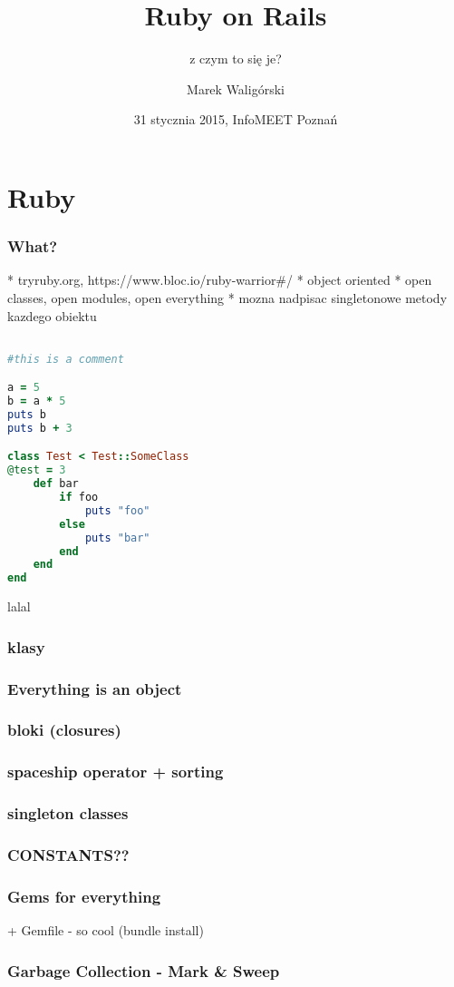 \documentclass{beamer}
\begin{document}
\title{Ruby on Rails}
\subtitle{z czym to się je?}
\author{Marek Waligórski}
\date{31 stycznia 2015, InfoMEET Poznań}

\begin{frame}[fragile]
\titlepage
\end{frame}

\section{Ruby}
\begin{frame}[fragile]\frametitle{What?}
  * tryruby.org, https://www.bloc.io/ruby-warrior#/
  * object oriented
  * open classes, open modules, open everything
  * mozna nadpisac singletonowe metody kazdego obiektu
\end{frame}

\begin{frame}[fragile]
\begin{lstlisting}[language=Ruby]

#this is a comment

a = 5
b = a * 5
puts b
puts b + 3

class Test < Test::SomeClass
@test = 3
    def bar
        if foo
            puts "foo"
        else
            puts "bar"
        end
    end
end
\end{lstlisting}
lalal
\end{frame}

\begin{frame}[fragile]
\frametitle{klasy}
\end{frame}
\begin{frame}[fragile]
\frametitle{Everything is an object}
\end{frame}
\begin{frame}[fragile]
\frametitle{bloki (closures)}
\end{frame}
\begin{frame}[fragile]
\frametitle{spaceship operator + sorting}
\end{frame}
\begin{frame}[fragile]
\frametitle{singleton classes}
\end{frame}
\begin{frame}[fragile]
\frametitle{CONSTANTS??}
\end{frame}
\begin{frame}[fragile]
\frametitle{Gems for everything}
 + Gemfile - so cool (bundle install)
\end{frame}
\begin{frame}[fragile]
\frametitle{Garbage Collection - Mark \& Sweep}
\end{frame}
\end{document}

